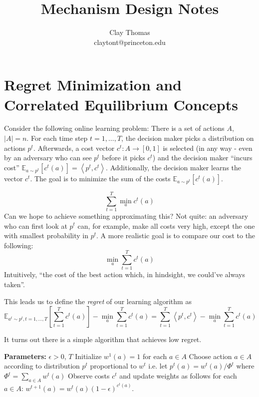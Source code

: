 \documentclass[12pt]{article}
\newcommand{\Es}[2]{\mathbb{E}_{#1}\left[{#2}\right]}
\newcommand{\ip}[2]{\left\langle{#1} , {#2}\right\rangle}
\begin{document}
 
\title{Mechanism Design Notes}
\author{Clay Thomas\\
claytont@princeton.edu}
\maketitle

\clearpage
\section{Regret Minimization and Correlated Equilibrium Concepts}

Consider the following online learning problem:
There is a set of actions $A$, $|A| = n$. For each time step $t=1,\ldots,T$,
the decision maker picks a distribution on actions $p^t$.
Afterwards, a cost vector $c^t : A\to [0,1]$ is selected
(in any way - even by an adversary who can see $p^t$ before it picks $c^t$)
and the decision maker ``incurs cost'' $\Es{a\sim p^t}{c^t(a)} = \ip{p^t}{c^t}$.
Additionally, the decision maker learns the vector $c^t$.
The goal is to minimize the sum of the costs $\Es{a\sim p^t}{c^t(a)}$.

\[ \sum_{t=1}^T \min_a c^t(a) \]
Can we hope to achieve something approximating this?
Not quite: an adversary who can first look at $p^t$ can, for example,
make all costs very high, except the one with smallest probability in $p^t$.
A more realistic goal is to compare our cost to the following:
\[ \min_a \sum_{t=1}^T c^t(a) \]
Intuitively, ``the cost of the best action which, in hindsight, we could've
always taken''.

This leads us to define the \emph{regret} of our learning algorithm as
\[ \Es{a^t\sim p^t, t=1,\ldots,T}{\sum_{t=1}^T c^t(a)} - \min_a \sum_{t=1}^T c^t(a) 
  = {\sum_{t=1}^T \ip{p^t}{c^t}} - \min_a \sum_{t=1}^T c^t(a) 
\]

It turns out there is a simple algorithm that achieves low regret.
\begin{algorithm}
  \begin{algorithmic}[0]
  \State \textbf{Parameters:} $\epsilon > 0$, $T$
  \State Initialize $w^1(a) = 1$ for each $a\in A$
    \State Choose action $a\in A$ according to distribution $p^t$ proportional to $w^t$
    \State \qquad i.e. let $p^t(a) = w^t(a) / \Phi^t$ where
      $\Phi^t = \sum_{a\in A} w^t(a)$
    \State Observe costs $c^t$ and update weights as follows for each $a\in A$:
    \State \qquad $w^{t+1}(a) = w^t(a) (1 - \epsilon)^{c^t(a)}$.
  \EndFor
\end{algorithmic}
\end{algorithm}
\end{document}
